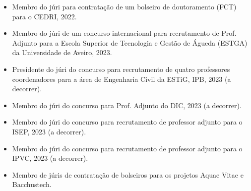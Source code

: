 \documentclass[11pt]{article}
\begin{document}
\begin{itemize}
\item{Membro do júri para contratação de um bolseiro de doutoramento (FCT) para o CEDRI, 2022.}
\item{Membro do júri de um concurso internacional para recrutamento de Prof. Adjunto para a Escola Superior de Tecnologia e Gestão de Águeda (ESTGA) da Universidade de Aveiro, 2023.}
\item{Presidente do júri do concurso para recrutamento de quatro professores coordenadores para a área de Engenharia Civil da ESTiG, IPB, 2023 (a decorrer).}
\item{Membro do júri do concurso para Prof. Adjunto do DIC, 2023 (a decorrer).}
\item{Membro do júri do concurso para recrutamento de professor adjunto para o ISEP, 2023 (a decorrer).}
\item{Membro do júri do concurso para recrutamento de professor adjunto para o IPVC, 2023 (a decorrer).}
\item{Membro de júris de contratação de bolseiros para os projetos Aquae Vitae e Bacchustech.}
\end{itemize}
\end{document}
